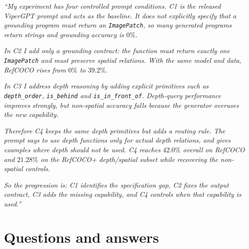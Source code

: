 \documentclass[11pt,a4paper]{article}
\begin{document}
\begin{callout}
\emph{``My experiment has four controlled prompt conditions. C1 is the released
ViperGPT prompt and acts as the baseline. It does not explicitly specify that a
grounding program must return an \texttt{ImagePatch}, so many generated programs
return strings and grounding accuracy is $0\%$.}

\smallskip
\emph{In C2 I add only a grounding contract: the function must return exactly one
\texttt{ImagePatch} and must preserve spatial relations. With the same model and data,
RefCOCO rises from $0\%$ to $39.2\%$.}

\smallskip
\emph{In C3 I address depth reasoning by adding explicit primitives such as
\texttt{depth\_order}, \texttt{is\_behind} and \texttt{is\_in\_front\_of}. Depth-query
performance improves strongly, but non-spatial accuracy falls because the generator
overuses the new capability.}

\smallskip
\emph{Therefore C4 keeps the same depth primitives but adds a routing rule. The prompt
says to use depth functions only for actual depth relations, and gives examples where
depth should not be used. C4 reaches $42.0\%$ overall on RefCOCO and $21.28\%$ on the
RefCOCO+ depth/spatial subset while recovering the non-spatial controls.}

\smallskip
\emph{So the progression is: C1 identifies the specification gap, C2 fixes the output
contract, C3 adds the missing capability, and C4 controls when that capability is
used.''}
\end{callout}

\section{Questions and answers}
\end{document}
